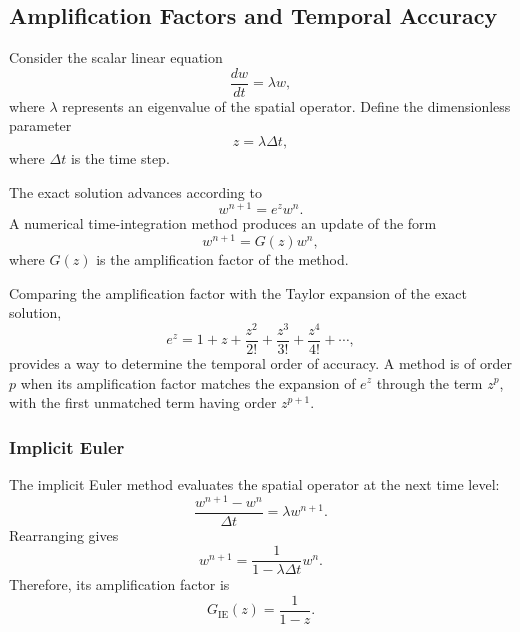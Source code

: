 \subsection{Amplification Factors and Temporal Accuracy}

Consider the scalar linear equation
\begin{equation}
\frac{dw}{dt}=\lambda w,
\label{eq:stability_test_equation}
\end{equation}
where $\lambda$ represents an eigenvalue of the spatial
operator. Define the dimensionless parameter
\begin{equation}
z=\lambda\Delta t,
\label{eq:stability_parameter}
\end{equation}
where $\Delta t$ is the time step.

The exact solution advances according to
\begin{equation}
w^{n+1}=e^z w^n.
\label{eq:exact_amplification}
\end{equation}
A numerical time-integration method produces an update of
the form
\begin{equation}
w^{n+1}=G(z)w^n,
\label{eq:numerical_amplification}
\end{equation}
where $G(z)$ is the amplification factor of the method.

Comparing the amplification factor with the Taylor expansion
of the exact solution,
\begin{equation}
e^z
=
1+z+\frac{z^2}{2!}
+\frac{z^3}{3!}
+\frac{z^4}{4!}+\cdots,
\label{eq:exact_taylor_expansion}
\end{equation}
provides a way to determine the temporal order of accuracy.
A method is of order $p$ when its amplification factor
matches the expansion of $e^z$ through the term $z^p$,
with the first unmatched term having order $z^{p+1}$.

\subsubsection{Implicit Euler}

The implicit Euler method evaluates the spatial operator
at the next time level:
\begin{equation}
\frac{w^{n+1}-w^n}{\Delta t}
=
\lambda w^{n+1}.
\end{equation}
Rearranging gives
\begin{equation}
w^{n+1}
=
\frac{1}{1-\lambda\Delta t}w^n.
\end{equation}
Therefore, its amplification factor is
\begin{equation}
\boxed{
G_{\mathrm{IE}}(z)=\frac{1}{1-z}.
}
\label{eq:implicit_euler_amplification}
\end{equation}

